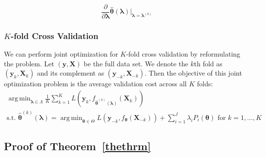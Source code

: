\documentclass[12pt,letterpaper]{article}
\DeclareMathOperator*{\argmin}{arg\,min}
\begin{document}
\begin{algorithm}
\begin{algorithmic}
{\begin{equation}
                      \frac{\partial}{\partial \boldsymbol{\lambda}} \hat{\boldsymbol \theta}(\boldsymbol{\lambda}) \Big |_{\boldsymbol{\lambda}=\boldsymbol{\lambda}^{(k)}}
                      \end{equation}
        }
	\ENDFOR
\end{algorithmic}
\end{algorithm}

\subsubsection{$K$-fold Cross Validation}
We can perform joint optimization for $K$-fold cross validation by reformulating the problem. Let $(\boldsymbol y, \boldsymbol{X})$ be the full data set. We denote the $k$th fold as $(\boldsymbol y_{k}, \boldsymbol{X}_{k})$ and its complement as $(\boldsymbol y_{-k}, \boldsymbol{X}_{-k})$. Then the objective of this joint optimization problem is the average validation cost across all $K$ folds:
\begin{equation}
\begin{array}{c}
\argmin_{\boldsymbol{\lambda} \in \Lambda} \frac{1}{K} \sum_{k=1}^K L(\boldsymbol{y}_{k}, f_{\hat{\boldsymbol \theta}^{(k)}(\boldsymbol{\lambda})}(\boldsymbol{X}_k)) \\
\text{s.t. } {\hat{\boldsymbol \theta}^{(k)}(\boldsymbol{\lambda})} = \argmin_{\boldsymbol \theta \in \Theta} L(\boldsymbol{y}_{-k}, f_{\boldsymbol \theta} (\boldsymbol{X}_{-k})) + \sum\limits_{i=1}^J \lambda_i P_i(\boldsymbol \theta) \text{ for } k=1,...,K
\end{array}
\label{jointoptFullCV}
\end{equation}

\subsection{Proof of Theorem~\ref{thethrm}}
\end{document}
